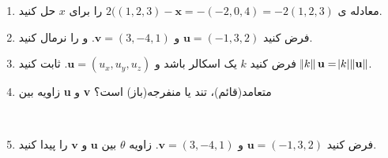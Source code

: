 {\begin{spacing}{1.5}
\begin{enumerate}
\begin{flushleft}
{                    {(d) $k(\textbf{u}+\textbf{v})=k\textbf{u}+k\textbf{v}$}
                    {(e) $\textbf{u}(k+c)=k\textbf{u}+c\textbf{u}$}
                }
            \end{flushleft}
            \begin{hint}{hnt:1}
                \Large
                فقط از تعریف عملیات برداری و خصوصیات اعداد حقیقی استفاده کنید.
                به عنوان مثال،
                \begin{equation*}
                    \centering
                    \begin{split}
                    (ck)
                        \textbf{u}&=(ck)(u_x,u_y,u_z)\\
                        &=((ck)u_x,(ck)u_y,(ck)u_z)\\
                        &=(c(ku_x),c(ku_y),c(ku_z))\\
                        &=c(ku_x,ku_y,ku_z)\\
                        &=c(k\textbf{u})
                    \end{split}
                \end{equation*}
            \end{hint}
            \\
            \item {معادله ی $2((1,2,3)-\textbf{x}=-(-2,0,4)=-2(1,2,3)$ را برای $x$ حل کنید.}
            \\
            \item {فرض کنید $\textbf{u}=(-1,3,2)$ و $\textbf{v}=(3,-4,1)$. و را نرمال کنید.}
            \\
            \item {فرض کنید $k$ یک اسکالر باشد و $\textbf{u}=(u_x,u_y,u_z)$. ثابت کنید $\norm{k}\textbf{u}=\abs{k}\norm{\textbf{u}}$. }
            \\
            \item {زاویه بین \textbf{u} و \textbf{v} متعامد(قائم)، تند یا منفرجه(باز) است؟}
            \begin{flushleft}
            \end{flushleft}
            \\
            \item {فرض کنید $\textbf{u}=(-1,3,2)$ و $\textbf{v}=(3,-4,1)$. زاویه $\theta$ بین $\textbf{u}$ و $\textbf{v}$ را پیدا کنید.}

\end{enumerate}
\end{spacing}}
